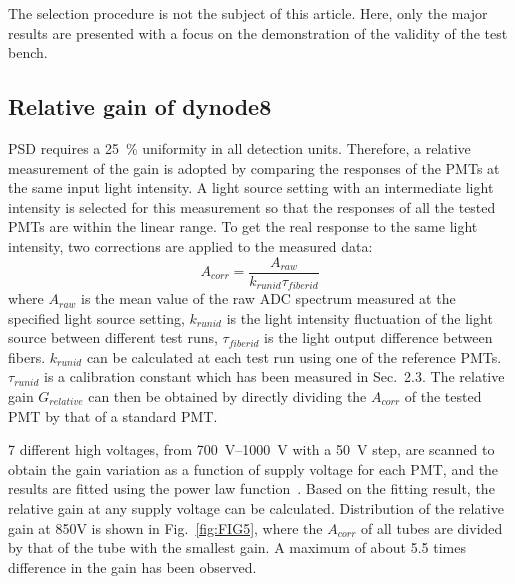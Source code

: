 \documentclass[a4paper,10pt,twoside]{cpc-hepnp}
\begin{document}
\begin{multicols}{2}
The selection procedure is not the subject of this article.
Here, only the major results are presented with a focus on the demonstration of the validity of the test bench. 

\subsection{Relative gain of dynode8}
\label{sec:psd_gain}

PSD requires a \SI{25}{\percent} uniformity in all detection units. 
Therefore, a relative measurement of the gain is adopted by comparing the responses of the PMTs at the same input light intensity.
A light source setting with an intermediate light intensity is selected for this measurement so that the responses of all the tested PMTs are within the linear range.    
To get the real response to the same light intensity, two corrections are applied to the measured data:
\begin{equation}
A_{corr} = \frac{A_{raw}}{k_{runid}\tau_{fiberid}}
\end{equation} 
where $A_{raw}$ is the mean value of the raw ADC spectrum measured at the specified light source setting,
$k_{runid}$ is the light intensity fluctuation of the light source between different test runs,
$\tau_{fiberid}$ is the light output difference between fibers.
$k_{runid}$ can be calculated at each test run using one of the reference PMTs.
$\tau_{runid}$ is a calibration constant which has been measured in Sec.~2.3.
The relative gain $G_{relative}$ can then be obtained by directly dividing the $A_{corr}$ of the tested PMT by that of a standard PMT.   

7 different high voltages, from \SIrange{700}{1000}{\volt} with a \SI{50}{\volt} step, are scanned to obtain the gain variation as a function of supply voltage for each PMT, and the results are fitted using the power law function~\citep{hamamatsu}.
Based on the fitting result, the relative gain at any supply voltage can be calculated.
Distribution of the relative gain at 850V is shown in Fig.~\ref{fig:FIG5}, where the $A_{corr}$ of all tubes are divided by that of the tube with the smallest gain. 
A maximum of about 5.5 times difference in the gain has been observed.


\end{multicols}
\end{document}
